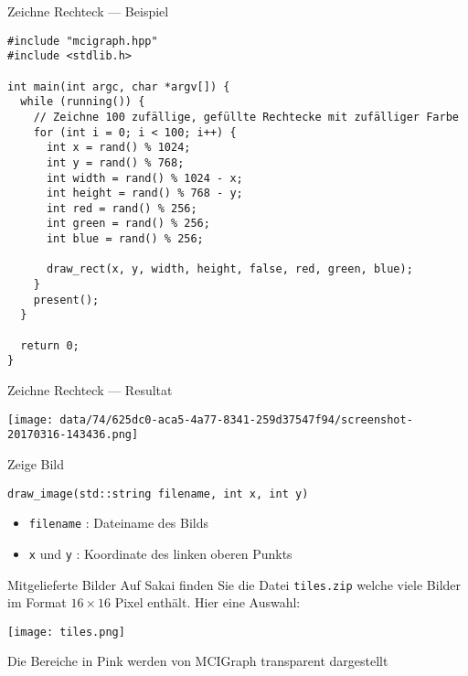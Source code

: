 \documentclass[presentation]{beamer}
\begin{document}
\begin{frame}[label={sec:orga2afede},fragile]{Zeichne Rechteck --- Beispiel}
 \begin{verbatim}
#include "mcigraph.hpp"
#include <stdlib.h>

int main(int argc, char *argv[]) {
  while (running()) {
    // Zeichne 100 zufällige, gefüllte Rechtecke mit zufälliger Farbe
    for (int i = 0; i < 100; i++) {
      int x = rand() % 1024;
      int y = rand() % 768;
      int width = rand() % 1024 - x;
      int height = rand() % 768 - y;
      int red = rand() % 256;
      int green = rand() % 256;
      int blue = rand() % 256;

      draw_rect(x, y, width, height, false, red, green, blue);
    }
    present();
  }

  return 0;
}
\end{verbatim}
\end{frame}
\begin{frame}[label={sec:org6210fc9}]{Zeichne Rechteck --- Resultat}
\begin{center}
\texttt{[image: data/74/625dc0-aca5-4a77-8341-259d37547f94/screenshot-20170316-143436.png]}
\end{center}
\end{frame}
\begin{frame}[label={sec:org17f7f92},fragile]{Zeige Bild}
 \begin{verbatim}
draw_image(std::string filename, int x, int y)
\end{verbatim}
\begin{itemize}
\item {\color{solarizedYellow}\verb!filename!} : Dateiname des Bilds
\item {\color{solarizedYellow}\verb!x!} und {\color{solarizedYellow}\verb!y!} : Koordinate des linken oberen Punkts
\end{itemize}
\begin{block}{Mitgelieferte Bilder}
Auf Sakai finden Sie die Datei {\color{solarizedYellow}\verb!tiles.zip!} welche viele Bilder im
Format \(16 \times 16\) Pixel enthält. Hier eine Auswahl:
\begin{center}
\texttt{[image: tiles.png]}
\end{center}
Die Bereiche in Pink werden von MCIGraph transparent dargestellt
\end{block}
\end{frame}
\end{document}
